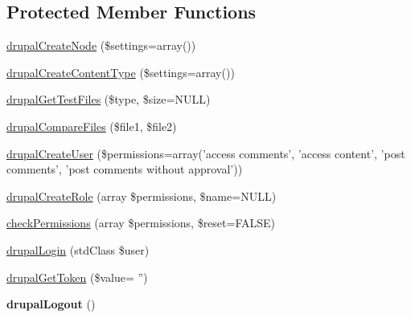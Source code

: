 \subsection*{Protected Member Functions}
\begin{DoxyCompactItemize}
\item 
\hyperlink{class_drupal_web_test_case_a73daf1ecd169e59a2acc47d57f06572f}{drupalCreateNode} (\$settings=array())
\item 
\hyperlink{class_drupal_web_test_case_a880b99e54830cd0a56e2f37b65ec337f}{drupalCreateContentType} (\$settings=array())
\item 
\hyperlink{class_drupal_web_test_case_ad1439acbfb7b5cd34e851d49106ba92f}{drupalGetTestFiles} (\$type, \$size=NULL)
\item 
\hyperlink{class_drupal_web_test_case_a7bdda4e6c7063f5dbcfecb1c70a03432}{drupalCompareFiles} (\$file1, \$file2)
\item 
\hyperlink{class_drupal_web_test_case_ad39222df2e8243c419d465bbe48b0713}{drupalCreateUser} (\$permissions=array('access comments', 'access content', 'post comments', 'post comments without approval'))
\item 
\hyperlink{class_drupal_web_test_case_ac704af37ef0e0d824af1407265bf750d}{drupalCreateRole} (array \$permissions, \$name=NULL)
\item 
\hyperlink{class_drupal_web_test_case_a12e53962cb95e9f6eb86efcc09b08615}{checkPermissions} (array \$permissions, \$reset=FALSE)
\item 
\hyperlink{class_drupal_web_test_case_adb24a311afdca9c565f3556fafb8044f}{drupalLogin} (stdClass \$user)
\item 
\hyperlink{class_drupal_web_test_case_a737d7788ee07da4f0184b6d489694070}{drupalGetToken} (\$value= '')
\item 
\hypertarget{class_drupal_web_test_case_a42e774876bd06cda74024379a3159896}{
{\bfseries drupalLogout} ()}
\label{class_drupal_web_test_case_a42e774876bd06cda74024379a3159896}


\end{DoxyCompactItemize}
